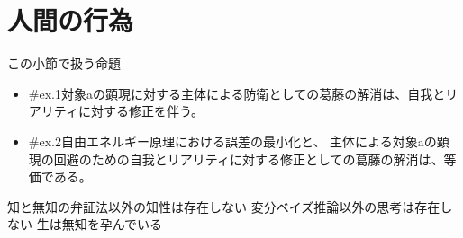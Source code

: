 \section{人間の行為}\label{ux4ebaux9593ux306eux884cux70ba}

\begin{note}{この小節で扱う命題}
  \begin{itemize}
    \tightlist
    \item{\#ex.1}対象aの顕現に対する主体による防衛としての葛藤の解消は、自我とリアリティに対する修正を伴う。
    \item{\#ex.2}自由エネルギー原理における誤差の最小化と、  主体による対象aの顕現の回避のための自我とリアリティに対する修正としての葛藤の解消は、等価である。
  \end{itemize}
\end{note}

知と無知の弁証法以外の知性は存在しない
変分ベイズ推論以外の思考は存在しない 生は無知を孕んでいる

